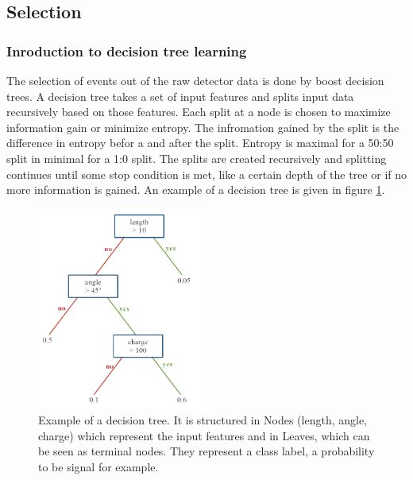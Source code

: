\documentclass[english]{uzhpub}
\begin{document}

 \subsection{Selection} \label{sec:clas}

 \subsubsection{Inroduction to decision tree learning}

The selection of events out of the raw detector data is done by boost decision trees. A decision tree takes a set of input features and splits input data recursively based on those features. Each split at a node is chosen to maximize information gain or minimize entropy. The infromation gained by the split is the difference in entropy befor a and after the split. Entropy is maximal for a 50:50 split in minimal for a 1:0 split.
The splits are created recursively and splitting continues until some stop condition is met, like a certain depth of the tree or if no more information is gained. An example of a decision tree is given in figure \ref{fig:tree}.

\begin{figure}[H]
 \centering
 \includegraphics[width=0.5\textwidth]{img/decision_tree}
 \caption{Example of a decision tree. It is structured in Nodes (length, angle, charge) which represent the input features and in Leaves, which can be seen as terminal nodes. They represent a class label, a probability to be signal for example.}
 \label{fig:tree}
\end{figure}
\end{document}
